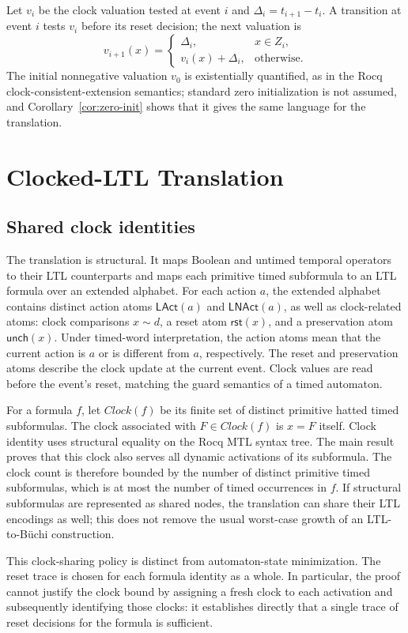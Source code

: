 \documentclass{ieeeaccess}
\newcommand{\Reset}{\mathsf{rst}}
\newcommand{\Unch}{\mathsf{unch}}
\newcommand{\Clock}{\mathit{Clock}}
\begin{document}
Let $v_i$ be the clock valuation tested at event $i$ and
$\Delta_i=t_{i+1}-t_i$. A transition at event $i$ tests $v_i$ before its
reset decision; the next valuation is
\[
v_{i+1}(x)=
\begin{cases}
\Delta_i,&x\in Z_i,\\
v_i(x)+\Delta_i,&\text{otherwise.}
\end{cases}
\]
The initial nonnegative valuation $v_0$ is existentially quantified, as in
the Rocq clock-consistent-extension semantics; standard zero initialization
is not assumed, and Corollary~\ref{cor:zero-init} shows that it gives the same
language for the translation.

\section{Clocked-LTL Translation}
\label{sec:translation}
\subsection{Shared clock identities}
The translation is structural. It maps Boolean and untimed temporal
operators to their LTL counterparts and maps each primitive timed subformula to an LTL
formula over an extended alphabet. For each action $a$, the extended
alphabet contains distinct action atoms $\mathsf{LAct}(a)$ and
$\mathsf{LNAct}(a)$, as well as clock-related atoms: clock comparisons
$x\sim d$, a reset atom
$\Reset(x)$, and a preservation atom $\Unch(x)$. Under timed-word
interpretation, the action atoms mean that the current action is $a$ or is
different from $a$, respectively. The reset
and preservation atoms describe the clock update at the current event. Clock
values are read before the event's reset, matching the guard semantics of a
timed automaton.

For a formula $f$, let $\Clock(f)$ be its finite set of distinct primitive
hatted timed subformulas. The clock associated with $F\in\Clock(f)$ is
$x=F$ itself. Clock identity uses structural equality on the Rocq MTL syntax
tree. The main result proves that this clock
also serves all dynamic activations of its subformula.
The clock count is therefore bounded by the number of distinct primitive
timed subformulas, which is at most the number of timed occurrences in $f$.
If structural subformulas are represented as shared nodes, the translation
can share their LTL encodings as well; this does not remove the usual
worst-case growth of an LTL-to-B\"uchi construction.

This clock-sharing policy is distinct from automaton-state minimization. The
reset trace is chosen for each formula identity as a whole. In particular,
the proof cannot justify the clock bound
by assigning a fresh clock to each activation and subsequently identifying
those clocks: it establishes directly that a single trace of reset decisions
for the formula is sufficient.
\end{document}
